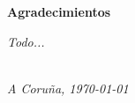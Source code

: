\vspace*{4em}

{\Huge\bfseries{Agradecimientos}\par}

\textit{Todo...}\par

\vspace*{\fill}

\begin{flushright}
	\authors \\
	\textit{A Coruña, \today}
\end{flushright}